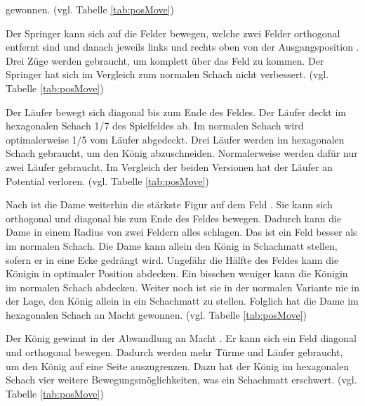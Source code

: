 gewonnen. (vgl. Tabelle \ref{tab:posMove})
\par
Der Springer kann sich auf die Felder bewegen, welche zwei Felder orthogonal entfernt sind und danach jeweils links und rechts oben von der Ausgangsposition \cite{GlinskiHexaChess}. Drei Züge werden gebraucht, um komplett über das Feld zu kommen. Der Springer hat sich im Vergleich zum normalen Schach nicht verbessert.  (vgl. Tabelle \ref{tab:posMove})\par
Der Läufer bewegt sich diagonal bis zum Ende des  Feldes\cite{GlinskiHexaChess}. Der Läufer deckt im hexagonalen Schach 1/7 des Spielfeldes ab. Im normalen Schach wird optimalerweise 1/5 vom Läufer abgedeckt. Drei Läufer werden im hexagonalen Schach gebraucht, um den König abzuschneiden. Normalerweise werden dafür nur zwei Läufer gebraucht. Im Vergleich der beiden Versionen hat der Läufer an Potential verloren. (vgl. Tabelle \ref{tab:posMove})
\par
Nach \cite{GlinskiHexaChess} ist die Dame weiterhin die stärkste Figur auf dem  Feld . Sie kann sich orthogonal und diagonal bis zum Ende des Feldes bewegen. Dadurch kann die Dame in einem Radius von zwei Feldern alles schlagen. Das ist ein Feld besser als im normalen Schach. Die Dame kann allein den König in Schachmatt stellen, sofern er in eine Ecke gedrängt wird. Ungefähr die Hälfte des Feldes kann die Königin in optimaler Position abdecken. Ein bisschen weniger kann die Königin im normalen Schach abdecken. Weiter noch ist sie in der normalen Variante nie in der Lage, den König allein in ein Schachmatt zu stellen. Folglich hat die Dame im hexagonalen Schach an Macht gewonnen. (vgl. Tabelle \ref{tab:posMove})\par
Der König gewinnt in der Abwandlung an Macht \cite{GlinskiHexaChess}. Er kann sich ein Feld diagonal und orthogonal bewegen. Dadurch werden mehr Türme und Läufer gebraucht, um den König auf eine Seite auszugrenzen. Dazu hat der König im hexagonalen Schach vier weitere Bewegungsmöglichkeiten, was ein Schachmatt erschwert. (vgl. Tabelle \ref{tab:posMove})
